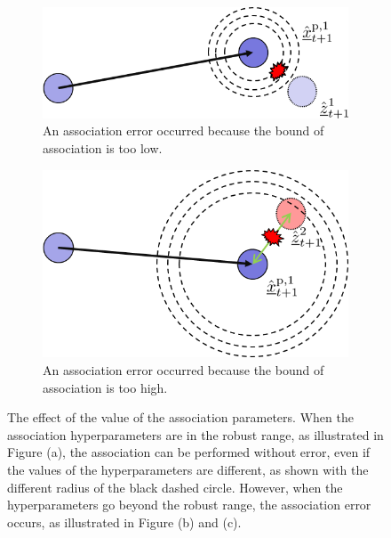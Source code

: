 \begin{figure}[htbp]
	\begin{subfigure}[t]{0.4\textwidth}
		\includegraphics[width=\textwidth]{figures/Asso/robust range2.png}
		\caption{An association error occurred because the bound of association is too low.}
		\label{robust range2}
	\end{subfigure}
	\quad
	\begin{subfigure}[t]{0.3\textwidth}
		\includegraphics[width=\textwidth]{figures/Asso/robust range3.png}
		\caption{An association error occurred because the bound of association is too high.}
		\label{robust range3}
	\end{subfigure}
	\caption{The effect of the value of the association parameters. When the association hyperparameters are in the robust range, as illustrated in Figure (a), the association can be performed without error, even if the values of the hyperparameters are different, as shown with the different radius of the black dashed circle. However, when the hyperparameters go beyond the robust range, the association error occurs, as illustrated in Figure (b) and (c).}
	\label{robust range}
\end{figure}


